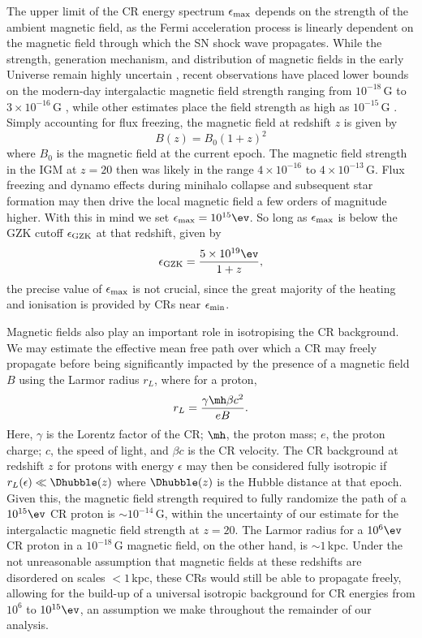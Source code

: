 The upper limit of the CR energy spectrum $\epsilon_{\rm max}$ depends on the strength of the ambient magnetic field, as the Fermi acceleration process is linearly dependent on the magnetic field through which the SN shock wave propagates. While the strength, generation mechanism, and distribution of magnetic fields in the early Universe remain highly uncertain \citep{DurrerNeronov2013}, recent observations have placed lower bounds on the modern-day intergalactic magnetic field strength ranging from $10^{-18}\,$G \citep{Dermeretal2011} to $3\times10^{-16}\,$G \citep{NeronovVovk2010}, while other estimates place the field strength as high as $10^{-15}\,$G \citep{AndoKusenko2010}.  Simply accounting for flux freezing, the magnetic field at redshift $z$ is given by
\begin{equation}
B(z) = B_0 (1+z)^2
\end{equation}
where $B_0$ is the magnetic field at the current epoch. The magnetic field strength in the IGM at $z=20$ then was likely in the range $4\times10^{-16}$ to $4\times10^{-13}\,$G.  Flux freezing and dynamo effects during minihalo collapse and subsequent star formation may then drive the local magnetic field a few orders of magnitude higher.  With this in mind we set $\epsilon_{\rm max} = 10^{15}\ev$.  So long as $\epsilon_{\rm max}$ is below the GZK cutoff $\epsilon_{\rm \small GZK}$ at that redshift, given by \citep{StacyBromm2007}
\begin{equation}
\epsilon_{\rm \small GZK} = \frac{5\times10^{19}\ev}{1+z},
\end{equation}
the precise value of $\epsilon_{\rm max}$ is not crucial, since the great majority of the heating and ionisation is provided by CRs near $\epsilon_{\rm min}$.

Magnetic fields also play an important role in isotropising the CR background.  We may estimate the effective mean free path over which a CR may freely propagate before being significantly impacted by the presence of a magnetic field $B$ using the Larmor radius $r_L$, where for a proton, 
\begin{equation}
r_L = \frac{\gamma \mh \beta c^2}{eB}.
\end{equation}
Here, $\gamma$ is the Lorentz factor of the CR; $\mh$, the proton mass; $e$, the proton charge; $c$, the speed of light, and $\beta c$ is the CR velocity. The CR background at redshift $z$ for protons with energy $\epsilon$ may then be considered fully isotropic if $r_L(\epsilon) \ll \Dhubble(z)$ where $\Dhubble(z)$ is the Hubble distance at that epoch. Given this, the magnetic field strength required to fully randomize the path of a $10^{15}\ev$ CR proton is $\sim$$10^{-14}\,$G, within the uncertainty of our estimate for the intergalactic magnetic field strength at $z=20$.  The Larmor radius for a $10^6\ev$ CR proton in a $10^{-18}\,$G magnetic field, on the other hand, is $\sim$$1\,$kpc.  Under the not unreasonable assumption that magnetic fields at these redshifts are disordered on scales $<1\,$kpc, these CRs would still be able to propagate freely, allowing for the build-up of a universal isotropic background for CR energies from $10^6$ to $10^{15}\ev$, an assumption we make throughout the remainder of our analysis.

